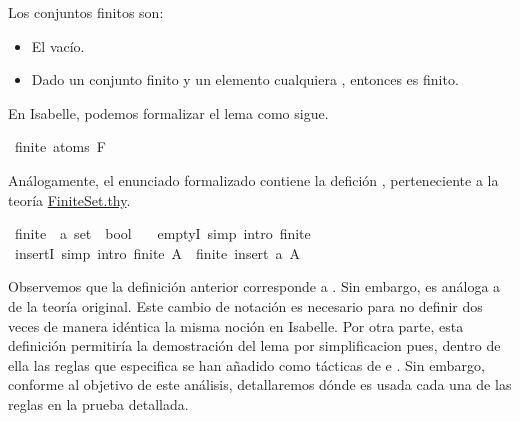 \begin{isabellebody}
\begin{isamarkuptext}
  \begin{definicion}
    Los conjuntos finitos son:
      \begin{itemize}
        \item El vacío.
        \item Dado un conjunto finito  y un elemento cualquiera , 
          entonces  es finito.
      \end{itemize}
  \end{definicion}


  En Isabelle, podemos formalizar el lema como sigue.%
\end{isamarkuptext}\isamarkuptrue%
\isamarkupfalse%
\ {\isachardoublequoteopen}finite\ {\isacharparenleft}atoms\ F{\isacharparenright}{\isachardoublequoteclose}\isanewline
%
\isadelimproof
\ \ %
\endisadelimproof
%
\isatagproof
{}\isamarkupfalse%
%
\endisatagproof
{\isafoldproof}%
%
\isadelimproof
%
\endisadelimproof
%
\begin{isamarkuptext}%
Análogamente, el enunciado formalizado contiene la defición 
  , perteneciente a la teoría 
  \href{https://n9.cl/x86r}{FiniteSet.thy}.%
\end{isamarkuptext}\isamarkuptrue%
\isamarkupfalse%
\ finite{\isacharprime}\ {\isacharcolon}{\isacharcolon}\ {\isachardoublequoteopen}{\isacharprime}a\ set\ {\isasymRightarrow}\ bool{\isachardoublequoteclose}\ \isanewline
\ \ emptyI{\isacharprime}\ {\isacharbrackleft}simp{\isacharcomma}\ intro{\isacharbang}{\isacharbrackright}{\isacharcolon}\ {\isachardoublequoteopen}finite{\isacharprime}\ {\isacharbraceleft}{\isacharbraceright}{\isachardoublequoteclose}\isanewline
{\isacharbar}\ insertI{\isacharprime}\ {\isacharbrackleft}simp{\isacharcomma}\ intro{\isacharbang}{\isacharbrackright}{\isacharcolon}\ {\isachardoublequoteopen}finite{\isacharprime}\ A\ {\isasymLongrightarrow}\ finite{\isacharprime}\ {\isacharparenleft}insert\ a\ A{\isacharparenright}{\isachardoublequoteclose}%
\begin{isamarkuptext}%
Observemos que la definición anterior corresponde a 
  . Sin embargo, es análoga a  de la 
  teoría original. Este cambio de notación es necesario para no definir 
  dos veces de manera idéntica la misma noción en Isabelle. Por otra 
  parte, esta definición permitiría la demostración del lema por 
  simplificacion pues, dentro de ella las reglas que especifica se han 
  añadido como tácticas de  e . Sin embargo, conforme al 
  objetivo de este análisis, detallaremos dónde es usada cada una de las 
  reglas en la prueba detallada. 


\end{isamarkuptext}
\end{isabellebody}
